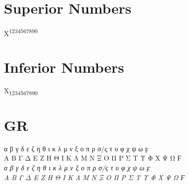 \documentclass[a4paper]{article}
\begin{document}
\section*{Superior Numbers}

X\textsuperscript{1234567890}

\section*{Inferior Numbers}

X\textsubscript{1234567890}

\section*{GR}

 α β γ δ ε ζ η θ ι κ λ μ ν ξ ο π ρ σ/ς τ υ φ χ ψ ω ϝ \\
 Α Β Γ Δ Ε Ζ Η Θ Ι Κ Λ Μ Ν Ξ Ο Π Ρ Σ Τ Υ Φ Χ Ψ Ω Ϝ\\
\textit{ α β γ δ ε ζ η θ ι κ λ μ ν ξ ο π ρ σ/ς τ υ φ χ ψ ω ϝ\\
 Α Β Γ Δ Ε Ζ Η Θ Ι Κ Λ Μ Ν Ξ Ο Π Ρ Σ Τ Υ Φ Χ Ψ Ω Ϝ}\par
 
\end{document}
